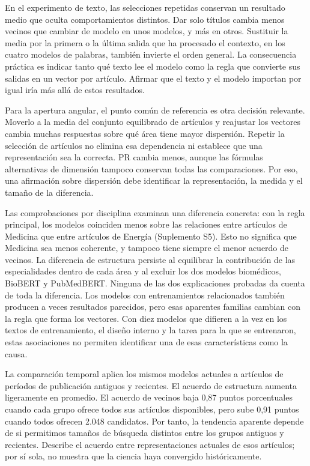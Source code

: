 \documentclass[12pt]{article}
\begin{document}
En el experimento de texto, las selecciones repetidas conservan un resultado medio que oculta comportamientos distintos. Dar solo títulos cambia menos vecinos que cambiar de modelo en unos modelos, y más en otros. Sustituir la media por la primera o la última salida que ha procesado el contexto, en los cuatro modelos de palabras, también invierte el orden general. La consecuencia práctica es indicar tanto qué texto lee el modelo como la regla que convierte sus salidas en un vector por artículo. Afirmar que el texto y el modelo importan por igual iría más allá de estos resultados.

Para la apertura angular, el punto común de referencia es otra decisión relevante. Moverlo a la media del conjunto equilibrado de artículos y reajustar los vectores cambia muchas respuestas sobre qué área tiene mayor dispersión. Repetir la selección de artículos no elimina esa dependencia ni establece que una representación sea la correcta. PR cambia menos, aunque las fórmulas alternativas de dimensión tampoco conservan todas las comparaciones. Por eso, una afirmación sobre dispersión debe identificar la representación, la medida y el tamaño de la diferencia.

Las comprobaciones por disciplina examinan una diferencia concreta: con la regla principal, los modelos coinciden menos sobre las relaciones entre artículos de Medicina que entre artículos de Energía (Suplemento S5). Esto no significa que Medicina sea menos coherente, y tampoco tiene siempre el menor acuerdo de vecinos. La diferencia de estructura persiste al equilibrar la contribución de las especialidades dentro de cada área y al excluir los dos modelos biomédicos, BioBERT y PubMedBERT. Ninguna de las dos explicaciones probadas da cuenta de toda la diferencia. Los modelos con entrenamientos relacionados también producen a veces resultados parecidos, pero esas aparentes familias cambian con la regla que forma los vectores. Con diez modelos que difieren a la vez en los textos de entrenamiento, el diseño interno y la tarea para la que se entrenaron, estas asociaciones no permiten identificar una de esas características como la causa.

La comparación temporal aplica los mismos modelos actuales a artículos de períodos de publicación antiguos y recientes. El acuerdo de estructura aumenta ligeramente en promedio. El acuerdo de vecinos baja 0,87 puntos porcentuales cuando cada grupo ofrece todos sus artículos disponibles, pero sube 0,91 puntos cuando todos ofrecen 2.048 candidatos. Por tanto, la tendencia aparente depende de si permitimos tamaños de búsqueda distintos entre los grupos antiguos y recientes. Describe el acuerdo entre representaciones actuales de esos artículos; por sí sola, no muestra que la ciencia haya convergido históricamente.
\end{document}
